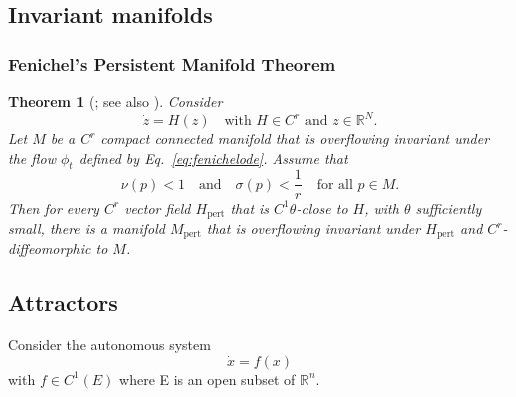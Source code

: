 \documentclass{article}
\newtheorem{theorem}{Theorem}
\theoremstyle{definition}
\theoremstyle{remark}
\newcommand{\reals}{\mathbb{R}}
\newcounter{ct}
\begin{document}
\subsection{Invariant manifolds}
\citep{roberts1989invariant,
kalitin2021attractors}

\citep{hirsch1970invariant}
\citep{wiggins1994nhim}
\citep{jones1995gspt}
\citep{kuehn2015multipletimescale}



\subsubsection{Fenichel's Persistent Manifold Theorem}\label{sec:fenichel}
\begin{theorem}[\citep{fenichel1971persistence}; see also \citep{kuehn2015multipletimescale}]
 Consider
\begin{equation}\label{eq:fenichelode}
\dot{z} = H(z) \quad \text{with } H \in C^r \text{ and } z \in \mathbb{R}^N. 
\end{equation}
Let \( M \) be a \( C^r \) compact connected manifold that is overflowing invariant under the flow \( \phi_t \) defined by Eq.~\ref{eq:fenichelode}. Assume that
\begin{equation}
\nu(p) < 1 \quad \text{and} \quad \sigma(p) < \frac{1}{r} \quad \text{for all } p \in M. 
\end{equation}
Then for every \( C^r \) vector field \( H_{\text{pert}} \) that is \( C^1 \theta \)-close to \( H \), with \( \theta \) sufficiently small, there is a manifold \( M_{\text{pert}} \) that is overflowing invariant under \( H_{\text{pert}} \) and \( C^r \)-diffeomorphic to \( M \).
\end{theorem}





\subsection{Attractors}
Consider the autonomous system
\begin{equation}\label{eq:attractorode}
\dot x = f(x)
\end{equation}
with \(f \in C^1(E)\) where E is an open subset of \(\reals^n\). 
\end{document}
